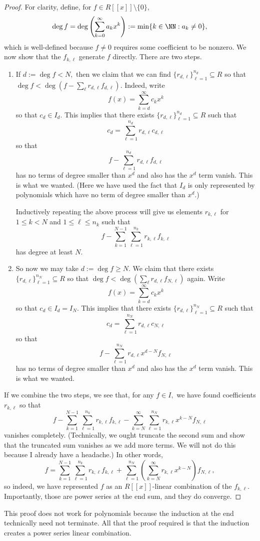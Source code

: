 \documentclass[../notes.tex]{subfiles}
\begin{document}
\begin{proof}
	For clarity, define, for $f\in R[[x]]\setminus\{0\},$
	\[\deg f=\deg\left(\sum_{k=0}^\infty a_kx^k\right):=\min\{k\in\NN:a_k\ne0\},\]
	which is well-defined because $f\ne0$ requires some coefficient to be nonzero. We now show that the $f_{k,\ell}$ generate $f$ directly. There are two steps.
	\begin{enumerate}
		\item If $d:=\deg f<N,$ then we claim that we can find $\{r_{d,\ell}\}_{\ell=1}^{n_d}\subseteq R$ so that $\deg f<\deg\left(f-\sum_\ell r_{d,\ell} f_{d,\ell}\right).$ Indeed, write
		\[f(x)=\sum_{k=d}^\infty c_kx^k\]
		so that $c_d\in I_d.$ This implies that there exists $\{r_{d,\ell}\}_{\ell=1}^{n_d}\subseteq R$ such that
		\[c_d=\sum_{\ell=1}^{n_d}r_{d,\ell} c_{d,\ell}\]
		so that
		\[f-\sum_{\ell=1}^{n_d}r_{d,\ell} f_{d,\ell}\]
		has no terms of degree smaller than $x^d$ and also has the $x^d$ term vanish. This is what we wanted. (Here we have used the fact that $I_d$ is only represented by polynomials which have no term of degree smaller than $x^d.$)

		Inductively repeating the above process will give us elements $r_{k,\ell}$ for $1\le k<N$ and $1\le\ell\le n_k$ such that
		\[f-\sum_{k=1}^{N-1}\sum_{\ell=1}^{n_k}r_{k,\ell}f_{k,\ell}\]
		has degree at least $N.$

		\item So now we may take $d:=\deg f\ge N.$ We claim that there exists $\{r_{d,\ell}\}_{\ell=1}^{n_N}\subseteq R$ so that $\deg f<\deg\left(\sum_\ell r_{d,\ell}f_{N,\ell}\right)$ again. Write
		\[f(x)=\sum_{k=d}^\infty c_kx^k\]
		so that $c_d\in I_d=I_N.$ This implies that there exists $\{r_{d,\ell}\}_{\ell=1}^{n_N}\subseteq R$ such that
		\[c_d=\sum_{\ell=1}^{n_N}r_{d,\ell} c_{N,\ell}\]
		so that
		\[f-\sum_{\ell=1}^{n_N}r_{d,\ell}x^{d-N}f_{N,\ell}\]
		has no terms of degree smaller than $x^d$ and also has the $x^d$ term vanish. This is what we wanted.
	\end{enumerate}
	If we combine the two steps, we see that, for any $f\in I,$ we have found coefficients $r_{k,\ell}$ so that
	\[f-\sum_{k=1}^{N-1}\sum_{\ell=1}^{n_k}r_{k,\ell}f_{k,\ell}-\sum_{k=N}^\infty\sum_{\ell=1}^{n_N}r_{k,\ell}x^{k-N}f_{N,\ell}\]
	vanishes completely. (Technically, we ought truncate the second sum and show that the truncated sum vanishes as we add more terms. We will not do this because I already have a headache.) In other words,
	\[f=\sum_{k=1}^{N-1}\sum_{\ell=1}^{n_k}r_{k,\ell}f_{k,\ell}+\sum_{\ell=1}^{n_N}\left(\sum_{k=N}^\infty r_{k,\ell}x^{k-N}\right)f_{N,\ell},\]
	so indeed, we have represented $f$ as an $R[[x]]$-linear combination of the $f_{k,\ell}.$ Importantly, those are power series at the end sum, and they do converge.
\end{proof}
\begin{remark}
	This proof does not work for polynomials because the induction at the end technically need not terminate. All that the proof required is that the induction creates a power series linear combination.
\end{remark}
\end{document}
